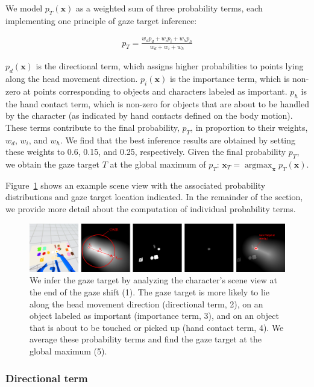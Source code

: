 We model $p_T(\mathbf{x})$ as a weighted sum of three probability terms, each implementing one principle of gaze target inference:

\begin{align} \label{eq:GazeTargetGlobalProbability}
p_T = \frac{w_d p_d + w_i p_i + w_h p_h}{w_d + w_i + w_h}
\end{align}

$p_d(\mathbf{x})$ is the directional term, which assigns higher probabilities to points lying along the head movement direction. $p_i(\mathbf{x})$ is the importance term, which is non-zero at points corresponding to objects and characters labeled as important. $p_h$ is the hand contact term, which is non-zero for objects that are about to be handled by the character (as indicated by hand contacts defined on the body motion). These terms contribute to the final probability, $p_T$, in proportion to their weights, $w_d$, $w_i$, and $w_h$. We find that the best inference results are obtained by setting these weights to 0.6, 0.15, and 0.25, respectively. Given the final probability $p_T$, we obtain the gaze target $T$ at the global maximum of $p_T$: $\mathbf{x}_T = \mathop{argmax}_{\mathbf{x}} p_T(\mathbf{x})$.

Figure~\ref{fig:GazeTargetInference} shows an example scene view with the associated probability distributions and gaze target location indicated. In the remainder of the section, we provide more detail about the computation of individual probability terms.

\begin{figure}
\centering
\includegraphics[width=1\textwidth]{gazeauthoring/Figures/GazeTargetInference.pdf}
\caption{We infer the gaze target by analyzing the character's scene view at the end of the gaze shift (1). The gaze target is more likely to lie along the head movement direction (directional term, 2), on an object labeled as important (importance term, 3), and on an object that is about to be touched or picked up (hand contact term, 4). We average these probability terms and find the gaze target at the global maximum (5).}
\label{fig:GazeTargetInference}
\end{figure}

\subsubsection{Directional term}

